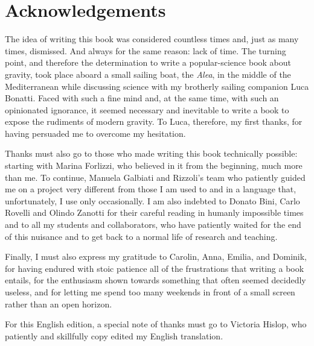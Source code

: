 \chapter*{Acknowledgements}\label{acknowledgements}

The idea of writing this book was considered countless times and, just as many times,
dismissed. And always for the same reason: lack of time. The turning point, and
therefore the determination to write a popular-science book about gravity, took place
aboard a small sailing boat, the \emph{Alea}, in the middle of the Mediterranean while
discussing science with my brotherly sailing companion Luca Bonatti. Faced with such a
fine mind and, at the same time, with such an opinionated ignorance, it seemed necessary
and inevitable to write a book to expose the rudiments of modern gravity. To Luca,
therefore, my first thanks, for having persuaded me to overcome my hesitation.

Thanks must also go to those who made writing this book technically possible: starting
with Marina Forlizzi, who believed in it from the beginning, much more than me. To
continue, Manuela Galbiati and Rizzoli's team who patiently guided me on a project very
different from those I am used to and in a language that, unfortunately, I use only
occasionally. I am also indebted to Donato Bini, Carlo Rovelli and Olindo Zanotti for
their careful reading in humanly impossible times and to all my students and
collaborators, who have patiently waited for the end of this nuisance and to get back to
a normal life of research and teaching.

Finally, I must also express my gratitude to Carolin, Anna, Emilia, and Dominik, for
having endured with stoic patience all of the frustrations that writing a book entails,
for the enthusiasm shown towards something that often seemed decidedly useless, and for
letting me spend too many weekends in front of a small screen rather than an open
horizon.

For this English edition, a special note of thanks must go to Victoria Hislop, who
patiently and skillfully copy edited my English translation.
